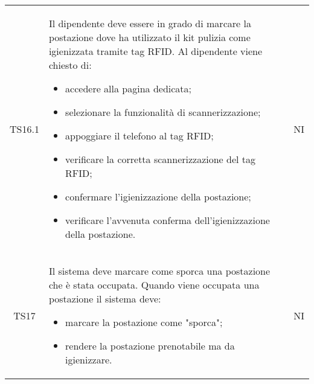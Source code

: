 {\begin{longtable}{ c C{11cm} c }
        TS16.1&
        \begin{flushleft}
            Il dipendente deve essere in grado di marcare la postazione dove ha utilizzato il kit pulizia come igienizzata tramite tag RFID.
            Al dipendente viene chiesto di:
        \end{flushleft}
        \begin{itemize}
            \item accedere alla pagina dedicata;
            \item selezionare la funzionalità di scannerizzazione;
            \item appoggiare il telefono al tag RFID;
            \item verificare la corretta scannerizzazione del tag RFID;
            \item confermare l'igienizzazione della postazione;
            \item verificare l'avvenuta conferma dell'igienizzazione della postazione.
        \end{itemize}&
        NI\\

        TS17&
        \begin{flushleft}
            Il sistema deve marcare come sporca una postazione che \`{e} stata occupata.
            Quando viene occupata una postazione il sistema deve:
        \end{flushleft}
        \begin{itemize}
            \item marcare la postazione come "sporca";
            \item rendere la postazione prenotabile ma da igienizzare.
        \end{itemize}&
        NI\\

     
        
    \end{longtable}
}